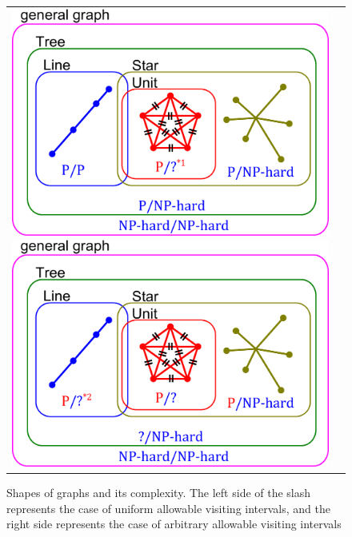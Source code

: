 \begin{figure}[htbp]
  \begin{tabular}{cc}
    \begin{minipage}{0.5\hsize}
      \centering
      \includegraphics[width=\hsize]{../fig1_adjust.pdf}
    \end{minipage}
    \begin{minipage}{0.5\hsize}
      \centering
      \includegraphics[width=\hsize]{../fig2_adjust.pdf}
    \end{minipage}
  \end{tabular}
  \caption{Shapes of graphs and its complexity.
  The left side of the slash represents the case of uniform allowable visiting intervals, and the right side represents the case of arbitrary allowable visiting intervals}
  \label{fig:shapeandcomplexity}
\end{figure}




